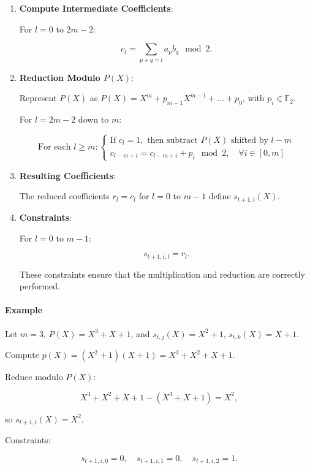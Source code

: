 \documentclass{article}
\theoremstyle{plain}
\theoremstyle{definition}
\theoremstyle{remark}
\theoremstyle{problem}
\begin{document}
\begin{enumerate}
    \item \textbf{Compute Intermediate Coefficients}:

    For $l = 0$ to $2m - 2$:

    \[
    c_l = \sum_{p+q = l} a_p b_q \mod 2.
    \]

    \item \textbf{Reduction Modulo $P(X)$}:

    Represent $P(X)$ as $P(X) = X^m + p_{m-1} X^{m-1} + \dots + p_0$, with $p_i \in \mathbb{F}_2$.

    For $l = 2m - 2$ down to $m$:

    \[
    \text{For each } l \geq m:
    \begin{cases}
        \text{If } c_l = 1, \text{ then subtract } P(X) \text{ shifted by } l - m \\
        c_{l - m + i} = c_{l - m + i} + p_i \mod 2, \quad \forall i \in [0, m]
    \end{cases}
    \]

    \item \textbf{Resulting Coefficients}:

    The reduced coefficients $r_l = c_l$ for $l = 0$ to $m - 1$ define $s_{t+1,i}(X)$.

    \item \textbf{Constraints}:

    For $l = 0$ to $m - 1$:

    \[
    s_{t+1,i,l} = r_l.
    \]

    These constraints ensure that the multiplication and reduction are correctly performed.
\end{enumerate}

\paragraph{Example}

Let $m = 3$, $P(X) = X^3 + X + 1$, and $s_{t,j}(X) = X^2 + 1$, $s_{t,k}(X) = X + 1$.

Compute $p(X) = (X^2 + 1)(X + 1) = X^3 + X^2 + X + 1$.

Reduce modulo $P(X)$:

\[
X^3 + X^2 + X + 1 - (X^3 + X + 1) = X^2,
\]

so $s_{t+1,i}(X) = X^2$.

Constraints:

\[
s_{t+1,i,0} = 0, \quad s_{t+1,i,1} = 0, \quad s_{t+1,i,2} = 1.
\]
\end{document}
